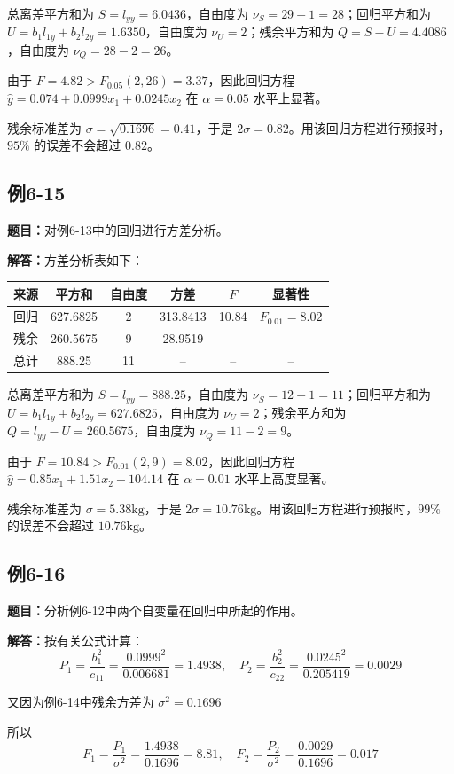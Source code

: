 \documentclass[UTF8,zihao=-4]{ctexart}
\newcommand{\problem}[1]{\subsection*{#1}}
\newcommand{\timu}{\noindent\textbf{题目：}}
\newcommand{\jieda}{\noindent\textbf{解答：}}
\begin{document}
总离差平方和为 $S=l_{yy}=6.0436$，自由度为 $\nu_S=29-1=28$；回归平方和为 $U=b_1l_{1y}+b_2l_{2y}=1.6350$，自由度为 $\nu_U=2$；残余平方和为 $Q=S-U=4.4086$，自由度为 $\nu_Q=28-2=26$。

由于 $F=4.82>F_{0.05}(2,26)=3.37$，因此回归方程 $\hat{y}=0.074+0.0999x_1+0.0245x_2$ 在 $\alpha=0.05$ 水平上显著。

残余标准差为 $\sigma=\sqrt{0.1696}=0.41$，于是 $2\sigma=0.82$。用该回归方程进行预报时，$95\%$ 的误差不会超过 $0.82$。

\newpage

\problem{例6-15}

\timu 对例6-13中的回归进行方差分析。

\jieda 方差分析表如下：

\begin{center}
\small
\setlength{\tabcolsep}{5pt}
\begin{tabular}{c|c|c|c|c|c}
\toprule
来源 & 平方和 & 自由度 & 方差 & $F$ & 显著性\\
\midrule
回归 & 627.6825 & 2 & 313.8413 & 10.84 & $F_{0.01}=8.02$\\
残余 & 260.5675 & 9 & 28.9519 & -- & --\\
总计 & 888.25 & 11 & -- & -- & --\\
\bottomrule
\end{tabular}
\end{center}

总离差平方和为 $S=l_{yy}=888.25$，自由度为 $\nu_S=12-1=11$；回归平方和为 $U=b_1l_{1y}+b_2l_{2y}=627.6825$，自由度为 $\nu_U=2$；残余平方和为 $Q=l_{yy}-U=260.5675$，自由度为 $\nu_Q=11-2=9$。

由于 $F=10.84>F_{0.01}(2,9)=8.02$，因此回归方程 $\hat{y}=0.85x_1+1.51x_2-104.14$ 在 $\alpha=0.01$ 水平上高度显著。

残余标准差为 $\sigma=5.38\mathrm{kg}$，于是 $2\sigma=10.76\mathrm{kg}$。用该回归方程进行预报时，$99\%$ 的误差不会超过 $10.76\mathrm{kg}$。

\problem{例6-16}

\timu 分析例6-12中两个自变量在回归中所起的作用。

\jieda 按有关公式计算：
\begin{equation*}
    P_1=\frac{b_1^2}{c_{11}}=\frac{0.0999^2}{0.006681}=1.4938,\quad P_2=\frac{b_2^2}{c_{22}}=\frac{0.0245^2}{0.205419}=0.0029
\end{equation*}

又因为例6-14中残余方差为 $\sigma^2=0.1696$

所以
\begin{equation*}
    F_1=\frac{P_1}{\sigma^2} = \frac{1.4938}{0.1696} = 8.81,\quad F_2=\frac{P_2}{\sigma^2} = \frac{0.0029}{0.1696} = 0.017
\end{equation*}
\end{document}
